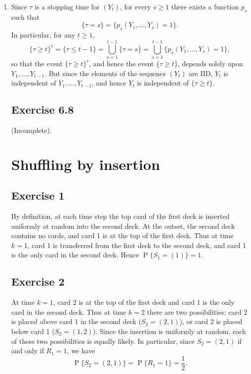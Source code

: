 \documentclass[12pt]{article}
\DeclareMathOperator{\Prob}{P}
\begin{document}
\begin{enumerate}[label=(\alph*)]
\item
Since $\tau$ is a stopping time for $(Y_t)$, for every $s \geq 1$ there exists a function $p_s$ such that
\begin{equation*}
\{\tau = s\} = \{p_s(Y_1, \ldots, Y_s) = 1\}.
\end{equation*}
In particular, for any $t \geq 1$,
\begin{equation*}
\{\tau \geq t\}^c = \{\tau \leq t - 1\} = \bigcup_{s=1}^{t-1} \{\tau = s\} = \bigcup_{s=1}^{t-1} \{p_s(Y_1, \ldots, Y_s) = 1\},
\end{equation*}
so that the event $\{\tau \geq t\}^c$, and hence the event $\{\tau \geq t\}$, depends solely upon $Y_1, \ldots, Y_{t-1}$. But since the elements of the sequence $(Y_t)$ are IID, $Y_t$ is independent of $Y_1, \ldots, Y_{t-1}$, and hence $Y_t$ is independent of $\{\tau \geq t\}$.

\subsection*{Exercise 6.8}

(Incomplete).

\section*{Shuffling by insertion}

\subsection*{Exercise 1}

By definition, at each time step the top card of the first deck is inserted uniformly at random into the second deck. At the outset, the second deck contains no cards, and card 1 is at the top of the first deck. Thus at time $k=1$, card 1 is transferred from the first deck to the second deck, and card 1 is the only card in the second deck. Hence $\Prob\{S_1 = (1)\} = 1$.

\subsection*{Exercise 2}

At time $k=1$, card 2 is at the top of the first deck and card 1 is the only card in the second deck. Thus at time $k=2$ there are two possibilities: card 2 is placed above card 1 in the second deck ($S_2 = (2, 1)$), or card 2 is placed below card 1 ($S_2 = (1, 2)$). Since the insertion is uniformly at random, each of these two possibilities is equally likely. In particular, since $S_2 = (2, 1)$ if and only if $R_1 = 1$, we have
\begin{equation*}
\Prob\{S_2 = (2, 1)\} = \Prob\{R_1 = 1\} = \frac{1}{2}.
\end{equation*}


\end{enumerate}
\end{document}
